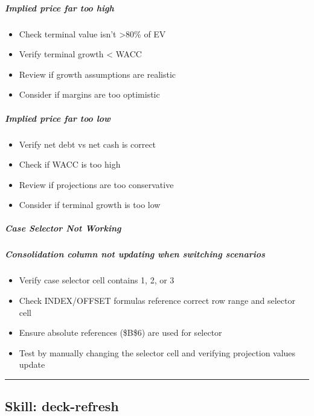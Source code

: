 \documentclass[11pt]{article}
\begin{document}
\subparagraph{Implied price far too high}\mbox{}\par
\begin{itemize}[leftmargin=*,itemsep=2pt,topsep=2pt]
\item {} Check terminal value isn't >80\% of EV
\item {} Verify terminal growth < WACC
\item {} Review if growth assumptions are realistic
\item {} Consider if margins are too optimistic
\end{itemize}

\subparagraph{Implied price far too low}\mbox{}\par
\begin{itemize}[leftmargin=*,itemsep=2pt,topsep=2pt]
\item {} Verify net debt vs net cash is correct
\item {} Check if WACC is too high
\item {} Review if projections are too conservative
\item {} Consider if terminal growth is too low
\end{itemize}

\subparagraph{Case Selector Not Working}\mbox{}\par

\subparagraph{Consolidation column not updating when switching scenarios}\mbox{}\par
\begin{itemize}[leftmargin=*,itemsep=2pt,topsep=2pt]
\item {} Verify case selector cell contains 1, 2, or 3
\item {} Check INDEX/OFFSET formulas reference correct row range and selector cell
\item {} Ensure absolute references (\$B\$6) are used for selector
\item {} Test by manually changing the selector cell and verifying projection values update
\end{itemize}

\vspace{0.8em}\hrule\vspace{0.8em}

\subsection{Skill: deck-refresh}\label{file:pitch-agent-skills-deck-refresh-SKILL-md}
\end{document}
